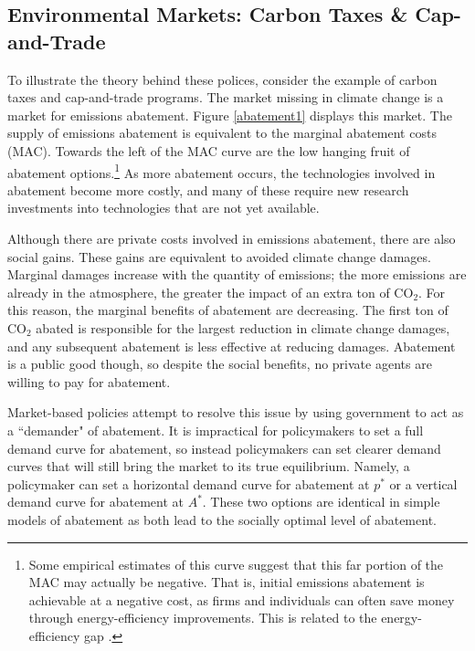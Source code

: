 \subsection{Environmental Markets: Carbon Taxes \& Cap-and-Trade}

To illustrate the theory behind these polices, consider the example of carbon taxes and cap-and-trade programs. The market missing in climate change is a market for emissions abatement. Figure \ref{abatement1} displays this market. The supply of emissions abatement is equivalent to the marginal abatement costs (MAC). Towards the left of the MAC curve are the low hanging fruit of abatement options.\footnote{Some empirical estimates of this curve suggest that this far portion of the MAC may actually be negative. That is, initial emissions abatement is achievable at a negative cost, as firms and individuals can often save money through energy-efficiency improvements. This is related to the energy-efficiency gap \citep[see][]{allcott2012there, gerarden2017assessing}.} As more abatement occurs, the technologies involved in abatement become more costly, and many of these require new research investments into technologies that are not yet available. 

Although there are private costs involved in emissions abatement, there are also social gains. These gains are equivalent to avoided climate change damages. Marginal damages increase with the quantity of emissions; the more emissions are already in the atmosphere, the greater the impact of an extra ton of CO$_2$. For this reason, the marginal benefits of abatement are decreasing. The first ton of CO$_2$ abated is responsible for the largest reduction in climate change damages, and any subsequent abatement is less effective at reducing damages. Abatement is a public good though, so despite the social benefits, no private agents are willing to pay for abatement. 

Market-based policies attempt to resolve this issue by using government to act as a ``demander" of abatement. It is impractical for policymakers to set a full demand curve for abatement, so instead policymakers can set clearer demand curves that will still bring the market to its true equilibrium. Namely, a policymaker can set a horizontal demand curve for abatement at $p^*$ or a vertical demand curve for abatement at $A^*$. These two options are identical in simple models of abatement as both lead to the socially optimal level of abatement. 


